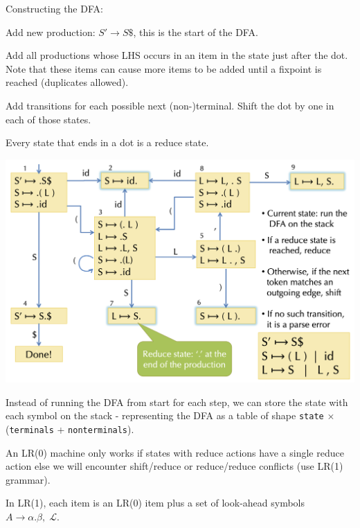 Constructing the DFA:
\begin{compactitem}[$\quad\bullet$]
	\item Add new production: $S' \to S\$$, this is the start of the DFA.

	\item Add all productions whose LHS occurs in an item in the state just after the dot. Note that these items can cause more items to be added until a fixpoint is reached (duplicates allowed).

	\item Add transitions for each possible next (non-)terminal. Shift the dot by one in each of those states.

	\item Every state that ends in a dot is a reduce state.
\end{compactitem}
\vspace{-10pt}
\begin{center}
	\includegraphics[width=0.9\linewidth]{assets/dfa.png}
\end{center}
\vspace{-10pt}

Instead of running the DFA from start for each step, we can store the state with each symbol on the stack - representing the DFA as a table of shape \texttt{state} $\times$ (\texttt{terminals} + \texttt{nonterminals}). \medskip

An LR(0) machine only works if states with reduce actions have a single reduce action else we will encounter shift/reduce or reduce/reduce conflicts (use LR(1) grammar). \medskip

In LR(1), each item is an LR(0) item plus a set of look-ahead symbols $A \to \alpha . \beta, \; \mathcal L$.\medskip

